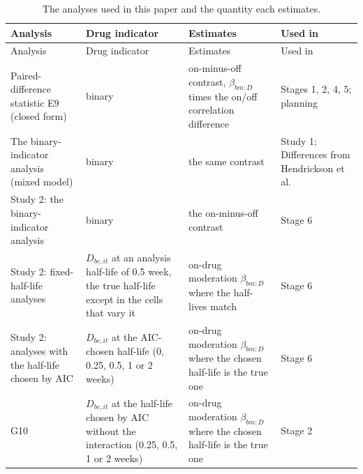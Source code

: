 \documentclass[
  11pt,
]{article}
\begin{document}
\begin{longtable}[]{@{}
  >{\raggedright\arraybackslash}p{}
  >{\raggedright\arraybackslash}p{}
  >{\raggedright\arraybackslash}p{}
  >{\raggedright\arraybackslash}p{}@{}}
\caption{\label{tab:estimands} The analyses used in this paper and the quantity each estimates.}\tabularnewline
\toprule\noalign{}
\begin{minipage}[b]{\linewidth}\raggedright
Analysis
\end{minipage} & \begin{minipage}[b]{\linewidth}\raggedright
Drug indicator
\end{minipage} & \begin{minipage}[b]{\linewidth}\raggedright
Estimates
\end{minipage} & \begin{minipage}[b]{\linewidth}\raggedright
Used in
\end{minipage} \\
\midrule\noalign{}
\endfirsthead
\toprule\noalign{}
\begin{minipage}[b]{\linewidth}\raggedright
Analysis
\end{minipage} & \begin{minipage}[b]{\linewidth}\raggedright
Drug indicator
\end{minipage} & \begin{minipage}[b]{\linewidth}\raggedright
Estimates
\end{minipage} & \begin{minipage}[b]{\linewidth}\raggedright
Used in
\end{minipage} \\
\midrule\noalign{}
\endhead
\bottomrule\noalign{}
\endlastfoot
Paired-difference statistic E9 (closed form) & binary & on-minus-off contrast, \(\beta_{bm:D}\) times the on/off correlation difference & Stages 1, 2, 4, 5; planning \\
The binary-indicator analysis (mixed model) & binary & the same contrast & Study 1; Differences from Hendrickson et al. \\
Study 2: the binary-indicator analysis & binary & the on-minus-off contrast & Stage 6 \\
Study 2: fixed-half-life analyses & \(D_{bc,it}\) at an analysis half-life of 0.5 week, the true half-life except in the cells that vary it & on-drug moderation \(\beta_{bm:D}\) where the half-lives match & Stage 6 \\
Study 2: analyses with the half-life chosen by AIC & \(D_{bc,it}\) at the AIC-chosen half-life (0, 0.25, 0.5, 1 or 2 weeks) & on-drug moderation \(\beta_{bm:D}\) where the chosen half-life is the true one & Stage 6 \\
G10 & \(D_{bc,it}\) at the half-life chosen by AIC without the interaction (0.25, 0.5, 1 or 2 weeks) & on-drug moderation \(\beta_{bm:D}\) where the chosen half-life is the true one & Stage 2 \\
\end{longtable}
\end{document}
